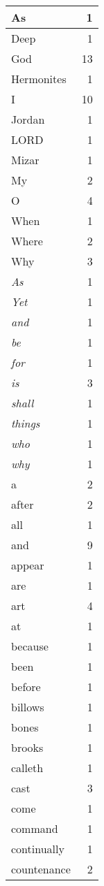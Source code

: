 \begin{center}
\begin{longtable}{l|r}
\hline \hline
\endlastfoot
As & 1 \\ \hline
Deep & 1 \\ \hline
God & 13 \\ \hline
Hermonites & 1 \\ \hline
I & 10 \\ \hline
Jordan & 1 \\ \hline
LORD & 1 \\ \hline
Mizar & 1 \\ \hline
My & 2 \\ \hline
O & 4 \\ \hline
When & 1 \\ \hline
Where & 2 \\ \hline
Why & 3 \\ \hline
\emph{As} & 1 \\ \hline
\emph{Yet} & 1 \\ \hline
\emph{and} & 1 \\ \hline
\emph{be} & 1 \\ \hline
\emph{for} & 1 \\ \hline
\emph{is} & 3 \\ \hline
\emph{shall} & 1 \\ \hline
\emph{things} & 1 \\ \hline
\emph{who} & 1 \\ \hline
\emph{why} & 1 \\ \hline
a & 2 \\ \hline
after & 2 \\ \hline
all & 1 \\ \hline
and & 9 \\ \hline
appear & 1 \\ \hline
are & 1 \\ \hline
art & 4 \\ \hline
at & 1 \\ \hline
because & 1 \\ \hline
been & 1 \\ \hline
before & 1 \\ \hline
billows & 1 \\ \hline
bones & 1 \\ \hline
brooks & 1 \\ \hline
calleth & 1 \\ \hline
cast & 3 \\ \hline
come & 1 \\ \hline
command & 1 \\ \hline
continually & 1 \\ \hline
countenance & 2 \\ \hline

\end{longtable}
\end{center}
